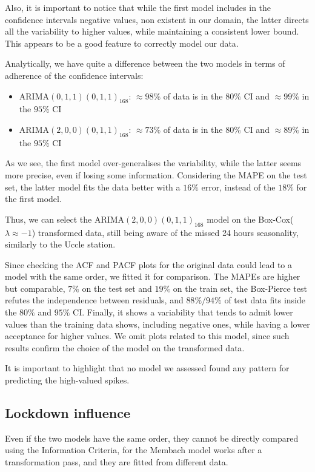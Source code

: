 \documentclass[12pt]{article}
\begin{document}
Also, it is important to notice that while the first model includes in the confidence intervals negative values, non existent in our domain, the latter directs all the variability to higher values, while maintaining a consistent lower bound. This appears to be a good feature to correctly model our data.

Analytically, we have quite a difference between the two models in terms of adherence of the confidence intervals:
\begin{itemize}[topsep=0.5em,itemsep=0em,partopsep=0.5em]
	\item $\mathrm{ARIMA}(0,1,1)(0,1,1)_{168}$: $\approx98\%$ of data is in the $80\%$ CI and $\approx99\%$ in the $95\%$ CI
	\item $\mathrm{ARIMA}(2,0,0)(0,1,1)_{168}$: $\approx73\%$ of data is in the $80\%$ CI and $\approx89\%$ in the $95\%$ CI
\end{itemize}
As we see, the first model over-generalises the variability, while the latter seems more precise, even if losing some information. Considering the MAPE on the test set, the latter model fits the data better with a $16\%$ error, instead of the $18\%$ for the first model.
%

Thus, we can select the $\mathrm{ARIMA}(2,0,0)(0,1,1)_{168}$ model on the Box-Cox($\lambda\approx-1$) transformed data, still being aware of the missed 24 hours seasonality, similarly to the Uccle station.

Since checking the ACF and PACF plots for the original data could lead to a model with the same order, we fitted it for comparison. The MAPEs are higher but comparable, $7\%$ on the test set and $19\%$ on the train set, the Box-Pierce test refutes the independence between residuals, and $88\%/94\%$ of test data fits inside the $80\%$ and $95\%$ CI. Finally, it shows a variability that tends to admit lower values than the training data shows, including negative ones, while having a lower acceptance for higher values. We omit plots related to this model, since such results confirm the choice of the model on the transformed data.

It is important to highlight that no model we assessed found any pattern for predicting the high-valued spikes.

\subsection{Lockdown influence}\label{sec:methodology:lockdown}
Even if the two models have the same order, they cannot be directly compared using the Information Criteria, for the Membach model works after a transformation pass, and they are fitted from different data.
\end{document}
